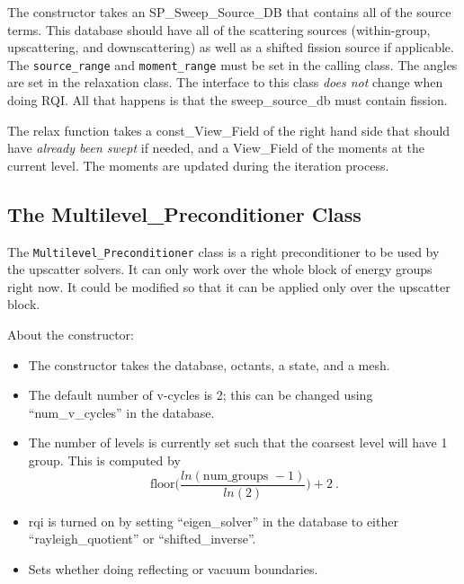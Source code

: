 \documentclass[12pt, letterpaper]{article}
\begin{document}
The constructor takes an SP\_Sweep\_Source\_DB that contains all of the source terms. This database should have all of the scattering sources (within-group, upscattering, and downscattering) as well as a shifted fission source if applicable. The \verb+source_range+ and \verb+moment_range+ must be set in the calling class. The angles are set in the relaxation class. The interface to this class \emph{does not} change when doing RQI. All that happens is that the sweep\_source\_db must contain fission. 

The relax function takes a const\_View\_Field of the right hand side that should have \emph{already been swept} if needed, and a View\_Field of the moments at the current level. The moments are updated during the iteration process.

\subsection{The Multilevel\_Preconditioner Class}
The \verb+Multilevel_Preconditioner+ class is a right preconditioner to be used by the upscatter solvers. It can only work over the whole block of energy groups right now. It could be modified so that it can be applied only over the upscatter block.

\noindent About the constructor:
\begin{itemize}
  \item The constructor takes the database, octants, a state, and a mesh.
  \item The default number of v-cycles is 2; this can be changed using ``num\_v\_cycles'' in the database.
  \item The number of levels is currently set such that the coarsest level will have 1 group. This is computed by
  \begin{equation}
    \text{floor}\bigl( \frac{ln(\text{num\_groups }-1)}{ln(2)}\bigr) + 2 \nonumber \:.
  \end{equation}
  \item rqi is turned on by setting ``eigen\_solver'' in the database to either ``rayleigh\_quotient'' or ``shifted\_inverse''.
  \item Sets whether doing reflecting or vacuum boundaries.
\end{itemize}
\end{document}
